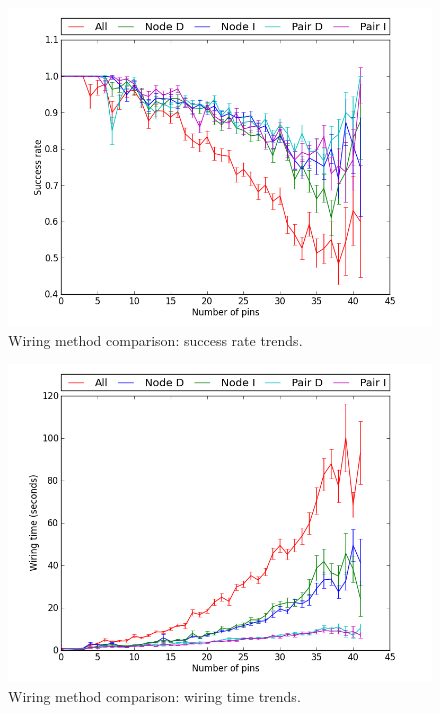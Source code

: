\begin{figure}[H]
\begin{center}
\includegraphics[width=\textwidth]{Images/wiring_success_trend_comparison.png}
\caption{Wiring method comparison: success rate trends.}
\label{fig:wiring_success_trend}
\end{center}
\end{figure}

\begin{figure}[H]
\begin{center}
\includegraphics[width=\textwidth]{Images/wiring_time_trend_comparison.png}
\caption{Wiring method comparison: wiring time trends.}
\label{fig:wiring_time_trend}
\end{center}
\end{figure}

